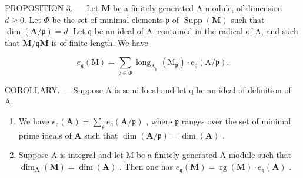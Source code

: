 PROPOSITION 3. — Let \(\mathbf{M}\) be a finitely generated A-module, of dimension \(d \geqslant 0\). Let \(\Phi\) be the set of minimal elements \(\mathfrak{p}\) of \(\operatorname{Supp}(\mathbf{M})\) such that \(\dim(\mathbf{A}/\mathfrak{p}) = d\). Let \(\mathfrak{q}\) be an ideal of A, contained in the radical of A, and such that \(\mathbf{M}/\mathfrak{q}\mathbf{M}\) is of finite length. We have

\[
e _ {\mathfrak {q}} (\mathrm{M}) = \sum_ {\mathfrak {p} \in \Phi} \operatorname{long} _ {\mathrm{A} _ {\mathfrak {p}}} (\mathrm{M} _ {\mathfrak {p}}) \cdot e _ {\mathfrak {q}} (\mathrm{A} / \mathfrak {p}).
\]

COROLLARY. — Suppose A is semi-local and let q be an ideal of definition of A.

\begin{enumerate}
\def\labelenumi{\alph{enumi})}
\item
  We have \(e_{\mathfrak{q}}(\mathbf{A}) = \sum_{\mathfrak{p}} e_{\mathfrak{q}}(\mathbf{A}/\mathfrak{p})\) , where \(\mathfrak{p}\) ranges over the set of minimal prime ideals of \(\mathbf{A}\) such that \(\dim(\mathbf{A}/\mathfrak{p}) = \dim(\mathbf{A})\) .
\item
  Suppose A is integral and let M be a finitely generated A-module such that \(\dim_{\mathbf{A}}(\mathbf{M}) = \dim(\mathbf{A})\) . Then one has \(e_{\mathfrak{q}}(\mathbf{M}) = \operatorname{rg}(\mathbf{M}) \cdot e_{\mathfrak{q}}(\mathbf{A})\) .
\end{enumerate}

